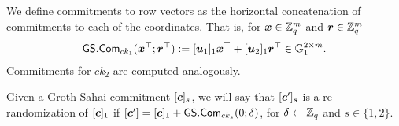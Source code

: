 We define commitments to row vectors as the horizontal concatenation of commitments to each of the coordinates. That is, for ${\boldsymbol{x}}\in\mathbb{Z}_q^m$ and ${\boldsymbol{r}}\in\mathbb{Z}_q^m$
\begin{align*}
{\mathsf{GS}}.\mathsf{Com}_{ck_1}({\boldsymbol{x}}^\top;{\boldsymbol{r}}^\top) := [{\boldsymbol{u}}_1]_1{\boldsymbol{x}}^\top+[{\boldsymbol{u}}_2]_1{\boldsymbol{r}}^\top\in\mathbb{G}_1^{2\times m}.
\end{align*}
Commitments for $ck_2$ are computed analogously.

Given a Groth-Sahai commitment $[{\boldsymbol{c}}]_s$, we will say that $[{\boldsymbol{c}}']_s$ is a re-randomization of $[{\boldsymbol{c}}]_1$ if $[{\boldsymbol{c}}'] = [{\boldsymbol{c}}]_1 + {\mathsf{GS}}.\mathsf{Com}_{ck_s}(0;\delta)$, for $\delta\gets\mathbb{Z}_q$ and $s\in\{1,2\}$. 
